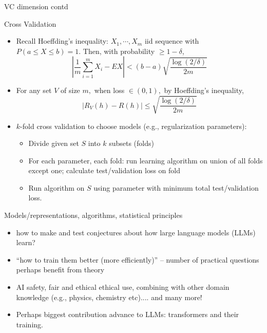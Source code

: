 \documentclass[final]{beamer}
\begin{document}
\begin{frame}{VC dimension contd}

\end{frame}
\begin{frame}{Cross Validation}
	\begin{itemize}
		\item Recall Hoeffding's inequality: $X_1,\cdots, X_m$ iid sequence with $P(a\leq X \leq b) = 1$. Then, with probability $\geq 1 - \delta$,
		$$ |\dfrac{1}{m} \sum_{i=1}^m X_i - EX |< (b-a) \sqrt{\dfrac{\log(2/\delta)}{2m}} $$
		\pause
		\item For any set $V$ of size $m,$ when loss $\in (0,1),$ by Hoeffding's inequality,
		$$|R_V(h) - R(h)| \leq \sqrt{\dfrac{\log(2/\delta)}{2m}}$$
	\end{itemize}
\end{frame}
\begin{frame}
	\begin{itemize}
	\item $k$-fold cross validation to choose models (e.g., regularization parameters): 
		\begin{itemize}
			\item Divide given set $S$ into $k$ subsets (folds)
			\item For each parameter, each fold: run learning algorithm on union of all folds except one; calculate test/validation loss on fold
			\item Run algorithm on $S$ using parameter with minimum total test/validation loss.
		\end{itemize}
\end{itemize}
\end{frame}
\begin{frame}{Models/representations, algorithms, statistical principles}
	\begin{itemize}
		\item how to make and test conjectures about how large language models (LLMs) learn?
		\pause
		\item ``how to train them better (more efficiently)'' -- number of practical questions perhaps benefit from theory
		\pause 
		\item AI safety, fair and ethical ethical use, combining with other domain knowledge (e.g., physics, chemistry etc).... and many more!
		\pause 
		\item Perhaps biggest contribution advance to LLMs: transformers and their training.
	\end{itemize}
\end{frame}
\end{document}
